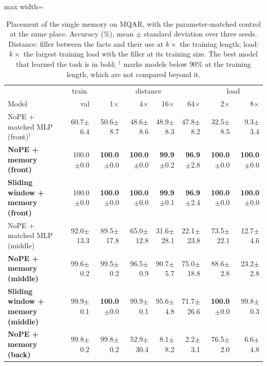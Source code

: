 \begin{table}\centering\small
\setlength{\tabcolsep}{4pt}
\begin{adjustbox}{max width=\linewidth}
\begin{tabular}{lrrrrrrr}
\toprule
 & \multicolumn{1}{c}{train} & \multicolumn{4}{c}{distance} & \multicolumn{2}{c}{load} \\
Model & val & 1$\times$ & 4$\times$ & 16$\times$ & 64$\times$ & 2$\times$ & 8$\times$ \\
\midrule
NoPE + matched MLP (front)$^\dagger$ & 60.7{\scriptsize$\pm$6.4} & 50.6{\scriptsize$\pm$8.7} & 48.6{\scriptsize$\pm$8.6} & 48.9{\scriptsize$\pm$8.3} & 47.8{\scriptsize$\pm$8.2} & 32.5{\scriptsize$\pm$8.5} & 9.3{\scriptsize$\pm$3.4} \\
\textbf{NoPE + memory (front)} & 100.0{\scriptsize$\pm$0.0} & \textbf{100.0}{\scriptsize$\pm$0.0} & \textbf{100.0}{\scriptsize$\pm$0.0} & \textbf{99.9}{\scriptsize$\pm$0.2} & \textbf{96.9}{\scriptsize$\pm$2.8} & \textbf{100.0}{\scriptsize$\pm$0.0} & \textbf{100.0}{\scriptsize$\pm$0.0} \\
\textbf{Sliding window + memory (front)} & 100.0{\scriptsize$\pm$0.0} & \textbf{100.0}{\scriptsize$\pm$0.0} & \textbf{100.0}{\scriptsize$\pm$0.0} & \textbf{99.9}{\scriptsize$\pm$0.1} & \textbf{96.9}{\scriptsize$\pm$2.4} & \textbf{100.0}{\scriptsize$\pm$0.0} & \textbf{100.0}{\scriptsize$\pm$0.0} \\
NoPE + matched MLP (middle) & 92.0{\scriptsize$\pm$13.3} & 89.5{\scriptsize$\pm$17.8} & 65.0{\scriptsize$\pm$12.8} & 31.6{\scriptsize$\pm$28.1} & 22.1{\scriptsize$\pm$23.8} & 73.5{\scriptsize$\pm$22.1} & 12.7{\scriptsize$\pm$4.6} \\
\textbf{NoPE + memory (middle)} & 99.6{\scriptsize$\pm$0.2} & 99.5{\scriptsize$\pm$0.2} & 96.5{\scriptsize$\pm$0.9} & 90.7{\scriptsize$\pm$5.7} & 75.0{\scriptsize$\pm$18.8} & 88.6{\scriptsize$\pm$2.8} & 23.2{\scriptsize$\pm$2.8} \\
\textbf{Sliding window + memory (middle)} & 99.9{\scriptsize$\pm$0.1} & \textbf{100.0}{\scriptsize$\pm$0.0} & 99.9{\scriptsize$\pm$0.1} & 95.6{\scriptsize$\pm$4.8} & 71.7{\scriptsize$\pm$26.6} & \textbf{100.0}{\scriptsize$\pm$0.0} & 99.8{\scriptsize$\pm$0.3} \\
\textbf{NoPE + memory (back)} & 99.8{\scriptsize$\pm$0.2} & 99.8{\scriptsize$\pm$0.2} & 52.9{\scriptsize$\pm$30.4} & 8.1{\scriptsize$\pm$8.2} & 2.2{\scriptsize$\pm$3.1} & 76.5{\scriptsize$\pm$2.0} & 6.6{\scriptsize$\pm$4.8} \\
\bottomrule
\end{tabular}
\end{adjustbox}
\caption{Placement of the single memory on MQAR, with the parameter-matched control at the same place. Accuracy (\%), mean $\pm$ standard deviation over three seeds. Distance: filler between the facts and their use at $k\times$ the training length; load: $k\times$ the largest training load with the filler at its training size. The best model that learned the task is in bold; $^\dagger$ marks models below 90\% at the training length, which are not compared beyond it.}
\label{tab:placement}
\end{table}
